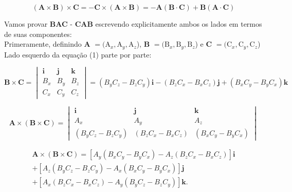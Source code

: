 \documentclass[a4paper,12pt]{article}
\begin{document}
\begin{equation}
    (\textbf{A}\times\textbf{B})\times\textbf{C} = -\textbf{C}\times(\textbf{A}\times\textbf{B}) = -\textbf{A}(\textbf{B}\cdot\textbf{C}) + \textbf{B}(\textbf{A}\cdot\textbf{C})
\end{equation}

Vamos provar \textbf{BAC} - \textbf{CAB} escrevendo explicitamente ambos os lados em termos de suas componentes:\\

Primeramente, definindo \textbf{A} $= (\textrm{A}_{x}, \textrm{A}_{y}, \textrm{A}_{z}$), \textbf{B} $= (\textrm{B}_{x}, \textrm{B}_{y}, \textrm{B}_{z}$) 
e \textbf{C} $= (\textrm{C}_{x}, \textrm{C}_{y}, \textrm{C}_{z}$)\\

Lado esquerdo da equa\c{c}\~ao (1) parte por parte:

\begin{equation}
    \mathbf{B} \times \mathbf{C} =
\begin{vmatrix}
\mathbf{i} & \mathbf{j} & \mathbf{k} \\
B_x & B_y & B_z \\
C_x & C_y & C_z
\end{vmatrix} =
(B_yC_z - B_zC_y)\mathbf{i} -
(B_zC_x - B_xC_z)\mathbf{j} +
(B_xC_y - B_yC_x)\mathbf{k}
\end{equation}


\begin{equation}
\mathbf{A} \times (\mathbf{B} \times \mathbf{C}) =
\begin{vmatrix}
\mathbf{i} & \mathbf{j} & \mathbf{k} \\
A_x & A_y & A_z \\
(B_yC_z - B_zC_y) & (B_zC_x - B_xC_z) & (B_xC_y - B_yC_x)
\end{vmatrix}
\end{equation}

\begin{equation}
    \begin{aligned}
    \mathbf{A} \times (\mathbf{B} \times \mathbf{C}) = \left[ A_y(B_xC_y - B_yC_x) - A_z(B_zC_x - B_xC_z) \right] \mathbf{i} \\ +
    \left[A_z(B_yC_z - B_zC_y) - A_x(B_xC_y - B_yC_x) \right] \mathbf{j}\\ +
    \left[ A_x(B_zC_x - B_xC_z) - A_y(B_yC_z - B_zC_y) \right] \mathbf{k}.
\end{aligned}
\end{equation}\\
\end{document}
